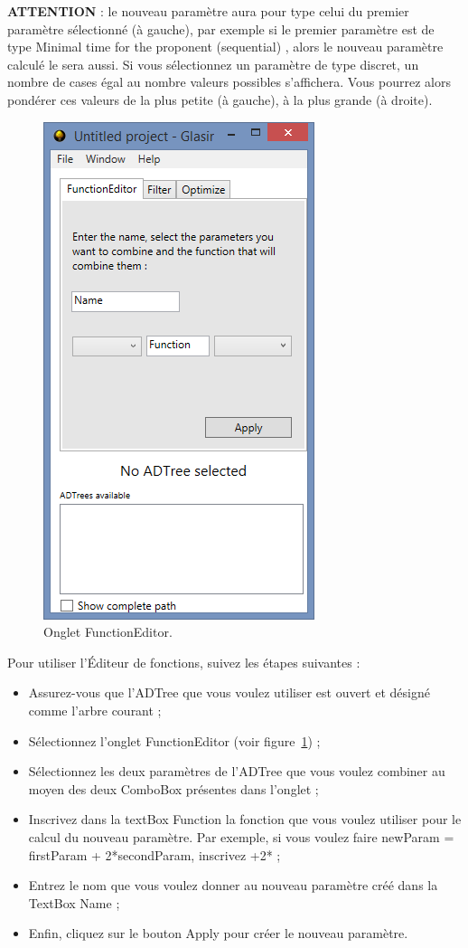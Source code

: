 \textbf{ATTENTION} : le nouveau paramètre aura pour type celui du premier paramètre sélectionné (à gauche), par exemple si le premier paramètre est de type \og Minimal time for the proponent (sequential) \fg , alors le nouveau paramètre calculé le sera aussi. Si vous sélectionnez un paramètre de type discret, un nombre de cases égal au nombre valeurs possibles s'affichera. Vous pourrez alors pondérer ces valeurs de la plus petite (à gauche), à la plus grande (à droite).

 \begin{figure}[H]
        \centering
        \includegraphics[height=0.7\textwidth]{figure/functionEdition.png}
        \caption{Onglet FunctionEditor.}
        \label{fig:functEdit}
    \end{figure}

Pour utiliser l'Éditeur de fonctions, suivez les étapes suivantes : 

\begin{itemize}
\item Assurez-vous que l'ADTree que vous voulez utiliser est ouvert et désigné comme l'arbre courant ;
\item Sélectionnez l'onglet \og FunctionEditor \fg{} (voir {\sc figure}~\ref{fig:functEdit}) ;
\item Sélectionnez les deux paramètres de l'ADTree que vous voulez combiner au moyen des deux ComboBox présentes dans l'onglet ;
\item Inscrivez dans la textBox \og Function \fg{} la fonction que vous voulez utiliser pour le calcul du nouveau paramètre. Par exemple, si vous voulez faire \og newParam = firstParam + 2*secondParam\fg , inscrivez \og +2* \fg{} ;
\item Entrez le nom que vous voulez donner au nouveau paramètre créé dans la TextBox \og Name \fg{} ;
\item Enfin, cliquez sur le bouton \og Apply\fg{} pour créer le nouveau paramètre.
\end{itemize} 

